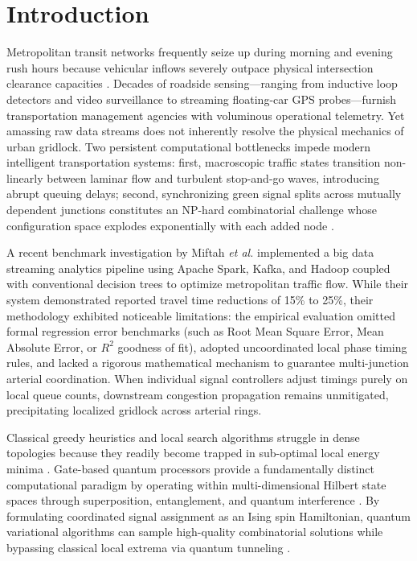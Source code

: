 \documentclass{llncs}
\begin{document}
\section{Introduction}

Metropolitan transit networks frequently seize up during morning and evening rush hours because vehicular inflows severely outpace physical intersection clearance capacities \cite{miftah2025big,greenshields1935study,daganzo1997fundamentals}. Decades of roadside sensing—ranging from inductive loop detectors and video surveillance to streaming floating-car GPS probes—furnish transportation management agencies with voluminous operational telemetry. Yet amassing raw data streams does not inherently resolve the physical mechanics of urban gridlock. Two persistent computational bottlenecks impede modern intelligent transportation systems: first, macroscopic traffic states transition non-linearly between laminar flow and turbulent stop-and-go waves, introducing abrupt queuing delays; second, synchronizing green signal splits across mutually dependent junctions constitutes an NP-hard combinatorial challenge whose configuration space explodes exponentially with each added node \cite{lucas2014ising}.

A recent benchmark investigation by Miftah \textit{et al.} \cite{miftah2025big} implemented a big data streaming analytics pipeline using Apache Spark, Kafka, and Hadoop coupled with conventional decision trees to optimize metropolitan traffic flow. While their system demonstrated reported travel time reductions of 15\% to 25\%, their methodology exhibited noticeable limitations: the empirical evaluation omitted formal regression error benchmarks (such as Root Mean Square Error, Mean Absolute Error, or $R^2$ goodness of fit), adopted uncoordinated local phase timing rules, and lacked a rigorous mathematical mechanism to guarantee multi-junction arterial coordination. When individual signal controllers adjust timings purely on local queue counts, downstream congestion propagation remains unmitigated, precipitating localized gridlock across arterial rings.

Classical greedy heuristics and local search algorithms struggle in dense topologies because they readily become trapped in sub-optimal local energy minima \cite{neukart2017traffic,alemi2024quantum}. Gate-based quantum processors provide a fundamentally distinct computational paradigm by operating within multi-dimensional Hilbert state spaces through superposition, entanglement, and quantum interference \cite{preskill2018quantum,farhi2014quantum,havlicek2019supervised}. By formulating coordinated signal assignment as an Ising spin Hamiltonian, quantum variational algorithms can sample high-quality combinatorial solutions while bypassing classical local extrema via quantum tunneling \cite{cerezo2021variational,bharti2022noisy}.
\end{document}
